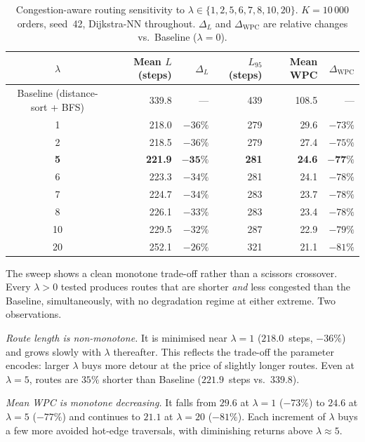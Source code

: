 \documentclass[12pt,a4paper]{article}
\begin{document}
\begin{table}[H]
\centering
\caption{Congestion-aware routing sensitivity to $\lambda \in \{1,2,5,6,7,8,10,20\}$.
  $K = 10\,000$ orders, seed~42, Dijkstra-NN throughout.
  $\Delta_L$ and $\Delta_\mathrm{WPC}$ are relative changes vs.\ Baseline ($\lambda=0$).}
\label{tab:lambda_sensitivity}
\renewcommand{\arraystretch}{1.20}
\begin{tabular}{crrrrr}
\hline
$\lambda$ & Mean $L$ (steps) & $\Delta_L$ & $L_{95}$ (steps) & Mean WPC & $\Delta_\mathrm{WPC}$ \\
\hline
Baseline (distance-sort + BFS) & 339.8 & ---       & 439 & 108.5 & ---       \\
1                              & 218.0 & $-36\%$   & 279 &  29.6 & $-73\%$   \\
2                              & 218.5 & $-36\%$   & 279 &  27.4 & $-75\%$   \\
\textbf{5}                     & \textbf{221.9} & $\mathbf{-35\%}$ & \textbf{281} & \textbf{24.6} & $\mathbf{-77\%}$ \\
6                              & 223.3 & $-34\%$   & 281 &  24.1 & $-78\%$   \\
7                              & 224.7 & $-34\%$   & 283 &  23.7 & $-78\%$   \\
8                              & 226.1 & $-33\%$   & 283 &  23.4 & $-78\%$   \\
10                             & 229.5 & $-32\%$   & 287 &  22.9 & $-79\%$   \\
20                             & 252.1 & $-26\%$   & 321 &  21.1 & $-81\%$   \\
\hline
\end{tabular}
\end{table}

The sweep shows a clean monotone trade-off rather than a scissors crossover.
Every $\lambda > 0$ tested produces routes that are shorter \emph{and} less
congested than the Baseline, simultaneously, with no degradation regime at
either extreme.
Two observations.

\emph{Route length is non-monotone.} It is minimised near $\lambda = 1$
($218.0$~steps, $-36\%$) and grows slowly with $\lambda$ thereafter.
This reflects the trade-off the parameter encodes: larger $\lambda$
buys more detour at the price of slightly longer routes.
Even at $\lambda = 5$, routes are $35\%$ shorter than Baseline
($221.9$~steps vs.\ $339.8$).

\emph{Mean WPC is monotone decreasing.} It falls from $29.6$ at
$\lambda = 1$ ($-73\%$) to $24.6$ at $\lambda = 5$ ($-77\%$) and
continues to $21.1$ at $\lambda = 20$ ($-81\%$).
Each increment of $\lambda$ buys a few more avoided hot-edge traversals,
with diminishing returns above $\lambda \approx 5$.
\end{document}
